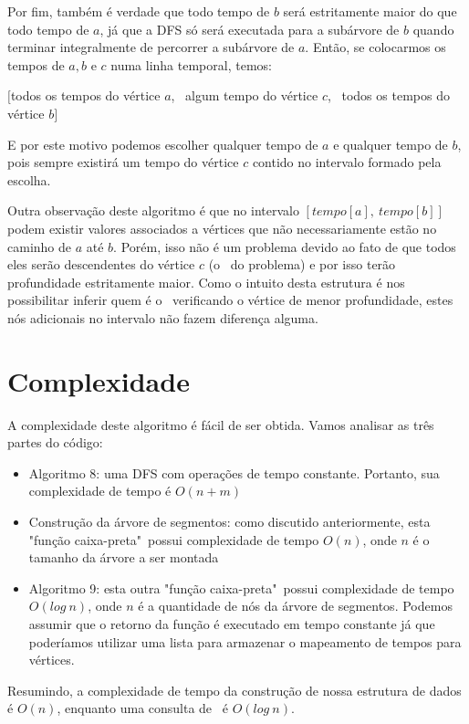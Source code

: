 Por fim, também é verdade que todo tempo de $b$ será estritamente maior do que todo tempo de $a$, já que a DFS só será executada para a subárvore de $b$ quando terminar integralmente de percorrer a subárvore de $a$. Então, se colocarmos os tempos de $a, b$ e $c$ numa linha temporal, temos:

\begin{center}
    $[$todos os tempos do vértice $a$, \ algum tempo do vértice $c$, \ todos os tempos do vértice $b]$
\end{center}

E por este motivo podemos escolher qualquer tempo de $a$ e qualquer tempo de $b$, pois sempre existirá um tempo do vértice $c$ contido no intervalo formado pela escolha.

\vspace{0.5cm}

Outra observação deste algoritmo é que no intervalo $[tempo[a],\ tempo[b]]$ podem existir valores associados a vértices que não necessariamente estão no caminho de $a$ até $b$. Porém, isso não é um problema devido ao fato de que todos eles serão descendentes do vértice $c$ (o \LCA\ do problema) e por isso terão profundidade estritamente maior. Como o intuito desta estrutura é nos possibilitar inferir quem é o \LCA\ verificando o vértice de menor profundidade, estes nós adicionais no intervalo não fazem diferença alguma.

\section{Complexidade}

A complexidade deste algoritmo é fácil de ser obtida. Vamos analisar as três partes do código:

\begin{itemize}
    \item Algoritmo 8: uma DFS com operações de tempo constante. Portanto, sua complexidade de tempo é $O(n+m)$
    \item Construção da árvore de segmentos: como discutido anteriormente, esta "função caixa-preta"\  possui complexidade de tempo $O(n)$, onde $n$ é o tamanho da árvore a ser montada
    \item Algoritmo 9: esta outra "função caixa-preta"\ possui complexidade de tempo $O(log\ n)$, onde $n$ é a quantidade de nós da árvore de segmentos. Podemos assumir que o retorno da função é executado em tempo constante já que poderíamos utilizar uma lista para armazenar o mapeamento de tempos para vértices.
\end{itemize}

Resumindo, a complexidade de tempo da construção de nossa estrutura de dados é $O(n)$, enquanto uma consulta de \LCA\ é $O(log\ n)$.